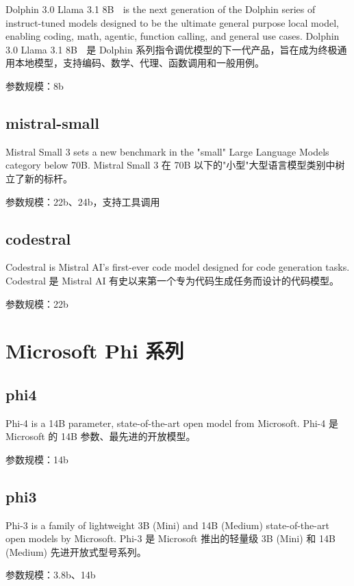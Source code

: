 \documentclass[12pt,UTF8]{ctexbook}
\begin{document}
Dolphin 3.0 Llama 3.1 8B 🐬 is the next generation of the Dolphin series of instruct-tuned models designed to be the ultimate general purpose local model, enabling coding, math, agentic, function calling, and general use cases.
Dolphin 3.0 Llama 3.1 8B 🐬 是 Dolphin 系列指令调优模型的下一代产品，旨在成为终极通用本地模型，支持编码、数学、代理、函数调用和一般用例。

参数规模：8b

\subsection{mistral-small}

Mistral Small 3 sets a new benchmark in the "small" Large Language Models category below 70B.
Mistral Small 3 在 70B 以下的"小型"大型语言模型类别中树立了新的标杆。

参数规模：22b、24b，支持工具调用

\subsection{codestral}

Codestral is Mistral AI's first-ever code model designed for code generation tasks.
Codestral 是 Mistral AI 有史以来第一个专为代码生成任务而设计的代码模型。

参数规模：22b

\section{Microsoft Phi 系列}

\subsection{phi4}

Phi-4 is a 14B parameter, state-of-the-art open model from Microsoft.
Phi-4 是 Microsoft 的 14B 参数、最先进的开放模型。

参数规模：14b

\subsection{phi3}

Phi-3 is a family of lightweight 3B (Mini) and 14B (Medium) state-of-the-art open models by Microsoft.
Phi-3 是 Microsoft 推出的轻量级 3B (Mini) 和 14B (Medium) 先进开放式型号系列。

参数规模：3.8b、14b
\end{document}
